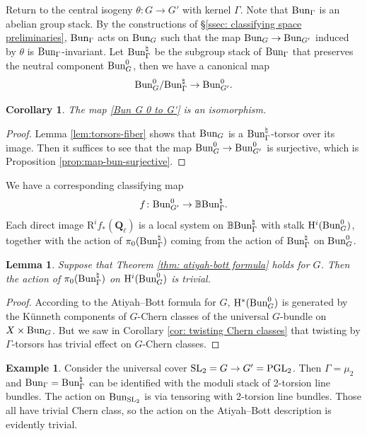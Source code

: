 \documentclass[reqno]{amsart}
\numberwithin{equation}{subsection}
\newtheorem{lemma}[subsubsection]{Lemma}
\newtheorem{cor}[subsubsection]{Corollary}
\theoremstyle{definition}
\newtheorem{exam}[subsubsection]{Example}
\def\BB{\mathbb{B}}
\newcommand{\Bun}{\textup{Bun}}
\newcommand\PGL{\textup{PGL}}
\newcommand\SL{\textup{SL}}
\newcommand{\Ql}{\Q_{\ell}}
\newcommand\na{\natural}
\newcommand{\Q}{\mathbf{Q}}
\newcommand{\co}{\colon}
\newcommand{\rH}{\ensuremath{\mathrm{H}}\xspace}
\newcommand{\rR}{\ensuremath{\mathrm{R}}\xspace}
\begin{document}
Return to the central isogeny $\theta \co G \rightarrow G'$ with kernel $\Gamma$. Note that $\Bun_\Gamma$ is an abelian group stack. By the constructions of \S \ref{ssec: classifying space preliminaries}, $\Bun_\Gamma$ acts on $\Bun_G$ such that the map $\Bun_G\to \Bun_{G'}$ induced by $\theta$ is $\Bun_\Gamma$-invariant. Let $\Bun_{\Gamma}^{\na}$ be the subgroup stack of $\Bun_{\Gamma}$ that preserves the neutral component $\Bun^{0}_{G}$, then we have a canonical map
\begin{equation}\label{Bun G 0 to G'}
\Bun_G^0/\Bun^{\na}_{\Gamma}\to \Bun_{G'}^0.
\end{equation}


\begin{cor} %
The map \eqref{Bun G 0 to G'} is an isomorphism. 
\end{cor}

\begin{proof}
Lemma \ref{lem:torsors-fiber} shows that $\Bun_G$ is a $\Bun_\Gamma^{\natural}$-torsor over its image. Then it suffices to see that the map $\Bun_G^0 \rightarrow \Bun_{G'}^0$ is surjective, which is Proposition \ref{prop:map-bun-surjective}.
\end{proof}

We have a corresponding classifying map 
\[
f \co \Bun_{G'}^0 \rightarrow \BB \Bun^{\na}_\Gamma.
\]
Each direct image $\rR^i f_* (\Ql)$ is a local system on $\BB \Bun^{\na}_{\Gamma}$ with stalk $\rH^i(\Bun^{0}_G)$, together with the action of $\pi_0(\Bun^{\na}_{\Gamma})$ coming from the action of $\Bun^{\na}_{\Gamma}$ on $\Bun^{0}_{G}$. 

\begin{lemma}\label{lem: trivial action} Suppose that Theorem \ref{thm: atiyah-bott formula} holds for $G$. Then the action of $\pi_0(\Bun^{\na}_{\Gamma})$ on $\rH^i(\Bun_G^0)$ is trivial. 
\end{lemma}

\begin{proof} According to the Atiyah--Bott formula for $G$, $\rH^*(\Bun^{0}_G)$ is generated by the K\"unneth components of $G$-Chern classes of the universal $G$-bundle on $X \times \Bun_G$. But we saw in Corollary \ref{cor: twisting Chern classes} that twisting by $\Gamma$-torsors has trivial effect on $G$-Chern classes. 
\end{proof}

\begin{exam}
Consider the universal cover $\SL_2  = G \rightarrow G' = \PGL_2$. Then $\Gamma = \mu_2$ and $\Bun_{\Gamma} = \Bun_{\Gamma}^{\na}$ can be identified with the moduli stack of 2-torsion line bundles. The action on $\Bun_{\SL_2}$ is via tensoring with 2-torsion line bundles. Those all have trivial Chern class, so the action on the Atiyah--Bott description is evidently trivial.
\end{exam}
\end{document}
